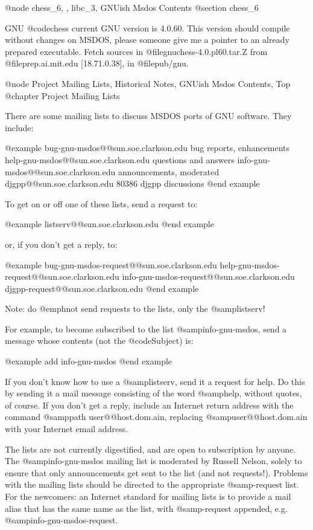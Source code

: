 @node chess_6,  , libc_3, GNUish Msdos Contents
@section chess_6

GNU @code{chess} current GNU version is 4.0.60.  This version should
compile without changes on MSDOS, please someone give me a pointer to an
already prepared executable.  Fetch sources in
@file{gnuchess-4.0.pl60.tar.Z} from @file{prep.ai.mit.edu} [18.71.0.38],
in @file{pub/gnu}.


@node Project Mailing Lists, Historical Notes, GNUish Msdos Contents, Top
@chapter Project Mailing Lists

There are some mailing lists to discuss MSDOS ports of GNU software.
They include:

@example
bug-gnu-msdos@@sun.soe.clarkson.edu     bug reports, enhancements
help-gnu-msdos@@sun.soe.clarkson.edu    questions and answers
info-gnu-msdos@@sun.soe.clarkson.edu    announcements, moderated
djgpp@@sun.soe.clarkson.edu             80386 djgpp discussions
@end example

To get on or off one of these lists, send a request to:

@example
listserv@@sun.soe.clarkson.edu
@end example

or, if you don't get a reply, to:

@example
bug-gnu-msdos-request@@sun.soe.clarkson.edu
help-gnu-msdos-request@@sun.soe.clarkson.edu
info-gnu-msdos-request@@sun.soe.clarkson.edu
djgpp-request@@sun.soe.clarkson.edu
@end example

Note: do @emph{not} send requests to the lists, only the
@samp{listserv}!

For example, to become subscribed to the list @samp{info-gnu-msdos},
send a message whose contents (not the @code{Subject}) is:

@example
add info-gnu-msdos
@end example

If you don't know how to use a @samp{listserv}, send it a request for
help.  Do this by sending it a mail message consisting of the word
@samp{help}, without quotes, of course.  If you don't get a reply,
include an Internet return address with the command @samp{path
user@@host.dom.ain}, replacing @samp{user@@host.dom.ain} with your
Internet email address.

The lists are not currently digestified, and are open to subscription by
anyone.  The @samp{info-gnu-msdos} mailing list is moderated by Russell
Nelson, solely to ensure that only announcements get sent to the list
(and not requests!).  Problems with the mailing lists should be directed
to the appropriate @samp{-request} list.  For the newcomers: an Internet
standard for mailing lists is to provide a mail alias that has the same
name as the list, with @samp{-request} appended, e.g.
@samp{info-gnu-msdos-request}.

